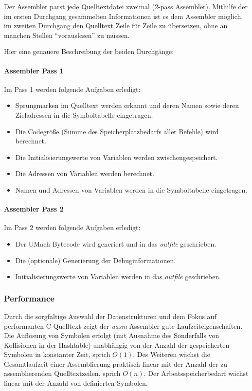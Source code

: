 Der Assembler parst jede Quelltextdatei zweimal (2-pass Assembler). Mithilfe der
im ersten Durchgang gesammelten Informationen ist es dem Assembler möglich, im
zweiten Durchgang den Quelltext Zeile für Zeile zu übersetzen, ohne an manchen
Stellen ``vorauslesen'' zu müssen.

Hier eine genauere Beschreibung der beiden Durchgänge:

\paragraph{Assembler Pass 1}

Im Pass 1 werden folgende Aufgaben erledigt:
\begin{itemize}
    \item Sprungmarken im Quelltext werden erkannt und deren Namen sowie deren
          Zieladressen in die Symboltabelle eingetragen.
    \item Die Codegröße (Summe des Speicherplatzbedarfs aller Befehle) wird
          berechnet.
    \item Die Initialisierungswerte von Variablen werden zwischengespeichert.
    \item Die Adressen von Variablen werden berechnet.
    \item Namen und Adressen von Variablen werden in die Symboltabelle
          eingetragen.
\end{itemize}

\paragraph{Assembler Pass 2}

Im Pass 2 werden folgende Aufgaben erledigt:
\begin{itemize}
    \item Der UMach Bytecode wird generiert und in das \emph{outfile}
          geschrieben.
    \item Die (optionale) Generierung der Debuginformationen.
    \item Initialisierungswerte von Variablen werden in das \emph{outfile}
          geschrieben.
\end{itemize}

\subsubsection{Performance}

Durch die sorgfältige Auswahl der Datenstrukturen und dem Fokus auf performanten
C-Quelltext zeigt der \emph{uasm} Assembler gute Laufzeiteigenschaften.
Die Auflösung von Symbolen erfolgt (mit Ausnahme des Sonderfalls von Kollisionen
in der Hashtable) unabhängig von der Anzahl der gespeicherten Symbolen in
konstanter Zeit, sprich $O(1)$.
Des Weiteren wächst die Gesamtlaufzeit einer Assemblierung praktisch linear mit
der Anzahl der zu assemblierenden Quelltextzeilen, sprich $O(n)$.
Der Arbeitsspeicherbedarf wächst linear mit der Anzahl von definierten Symbolen.

